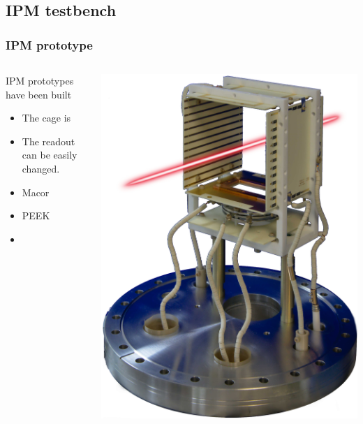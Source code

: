\subsection{IPM testbench}
\begin{frame}
  \frametitle{IPM prototype}
  \begin{columns}
    \begin{column}{0.45\textwidth}
      IPM prototypes have been built

      \begin{itemize}
        \item The cage is
        \item The readout can be easily changed.
      \end{itemize}

      \begin{itemize}
        \item Macor
        \item PEEK
        \item
      \end{itemize}

    \end{column}
    \begin{column}{0.45\textwidth}
      \includegraphics[width=\textwidth]{04_Test/fig/fig000_IPM_photo2}
    \end{column}
  \end{columns}
\end{frame}

